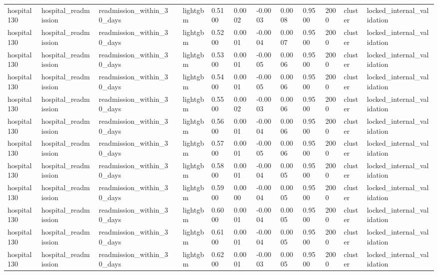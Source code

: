 \begin{tabular}{lllllllllllll}
hospital130 & hospital\_readmission & readmission\_within\_30\_days &  & lightgbm & 0.5100 & 0.0002 & -0.0003 & 0.0008 & 0.9500 & 2000 & cluster & locked\_internal\_validation \\
hospital130 & hospital\_readmission & readmission\_within\_30\_days &  & lightgbm & 0.5200 & 0.0001 & -0.0004 & 0.0007 & 0.9500 & 2000 & cluster & locked\_internal\_validation \\
hospital130 & hospital\_readmission & readmission\_within\_30\_days &  & lightgbm & 0.5300 & 0.0001 & -0.0005 & 0.0006 & 0.9500 & 2000 & cluster & locked\_internal\_validation \\
hospital130 & hospital\_readmission & readmission\_within\_30\_days &  & lightgbm & 0.5400 & 0.0001 & -0.0005 & 0.0006 & 0.9500 & 2000 & cluster & locked\_internal\_validation \\
hospital130 & hospital\_readmission & readmission\_within\_30\_days &  & lightgbm & 0.5500 & 0.0002 & -0.0003 & 0.0006 & 0.9500 & 2000 & cluster & locked\_internal\_validation \\
hospital130 & hospital\_readmission & readmission\_within\_30\_days &  & lightgbm & 0.5600 & 0.0001 & -0.0004 & 0.0006 & 0.9500 & 2000 & cluster & locked\_internal\_validation \\
hospital130 & hospital\_readmission & readmission\_within\_30\_days &  & lightgbm & 0.5700 & 0.0001 & -0.0005 & 0.0006 & 0.9500 & 2000 & cluster & locked\_internal\_validation \\
hospital130 & hospital\_readmission & readmission\_within\_30\_days &  & lightgbm & 0.5800 & 0.0001 & -0.0004 & 0.0005 & 0.9500 & 2000 & cluster & locked\_internal\_validation \\
hospital130 & hospital\_readmission & readmission\_within\_30\_days &  & lightgbm & 0.5900 & 0.0000 & -0.0004 & 0.0005 & 0.9500 & 2000 & cluster & locked\_internal\_validation \\
hospital130 & hospital\_readmission & readmission\_within\_30\_days &  & lightgbm & 0.6000 & 0.0001 & -0.0004 & 0.0005 & 0.9500 & 2000 & cluster & locked\_internal\_validation \\
hospital130 & hospital\_readmission & readmission\_within\_30\_days &  & lightgbm & 0.6100 & 0.0001 & -0.0004 & 0.0005 & 0.9500 & 2000 & cluster & locked\_internal\_validation \\
hospital130 & hospital\_readmission & readmission\_within\_30\_days &  & lightgbm & 0.6200 & 0.0001 & -0.0003 & 0.0005 & 0.9500 & 2000 & cluster & locked\_internal\_validation \\

\end{tabular}
